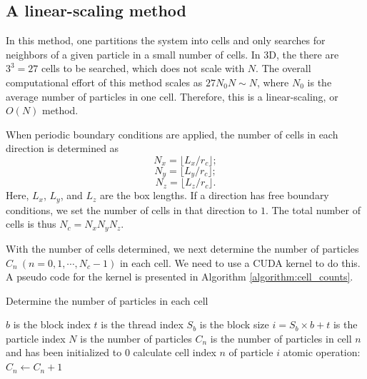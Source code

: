 \documentclass[12pt,a4paper]{report}
\begin{document}
\subsection{A linear-scaling method}


In this method, one partitions the system into cells and only searches for neighbors of a given particle in a small number of cells. In 3D, the there are $3^3=27$ cells to be searched, which does not scale with $N$. The overall computational effort of this method scales as $27N_0N \sim N$, where $N_0$ is the average number of particles in one cell. Therefore, this is a linear-scaling, or $O(N)$ method.

When periodic boundary conditions are applied, the number of cells in each direction is determined as
\begin{equation}
N_{x} = \lfloor L_x / r_c \rfloor;
\end{equation}
\begin{equation}
N_{y} = \lfloor L_y / r_c \rfloor;
\end{equation}
\begin{equation}
N_{z} = \lfloor L_z / r_c \rfloor.
\end{equation}
Here, $L_x$, $L_y$, and $L_z$ are the box lengths.
If a direction has free boundary conditions, we set the number of cells in that direction to $1$. The total number of cells is thus $N_c = N_x N_y N_z$.

With the number of cells determined, we next determine the number of particles $C_n ~(n=0, 1, \cdots, N_c-1)$ in each cell. We need to use a CUDA kernel to do this. A pseudo code for the kernel is presented in Algorithm  \ref{algorithm:cell_counts}.


\begin{algorithm}[htbp]
\caption{Determine the number of particles in each cell}
\label{algorithm:cell_counts}
\begin{algorithmic}[1]
\Require $b$ is the block index
\Require $t$ is the thread index
\Require $S_b$ is the block size
\Require $i=S_b\times b+t$ is the particle index
\Require $N$ is the number of particles
\Require $C_n$ is the number of particles in cell $n$ and has been initialized to 0
	\State calculate cell index $n$ of particle $i$
	\State atomic operation: $C_n \leftarrow C_n +1$
\EndIf
 \end{algorithmic}
\end{algorithm}
\end{document}
